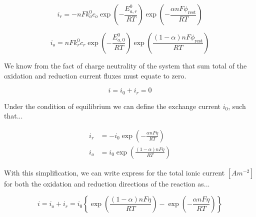 \documentclass[lettersize,journal]{IEEEtran}
\begin{document}
\begin{equation}
i_{r}=-n F k_{o}^{0} c_{o} \exp \left(-\frac{E_{a, r}^{0}}{R T}\right) \exp \left(-\frac{\alpha n F \phi_{\mathrm{rest}}}{R T}\right)
\end{equation}

\begin{equation}
i_{o}=n F k_{r}^{0} c_{r} \exp \left(-\frac{E_{a, 0}^{0}}{R T}\right) \exp \left(\frac{(1-\alpha) n F \phi_{\mathrm{rest}}}{R T}\right)
\end{equation}

\noindent We know from the fact of charge neutrality of the system that sum total of the oxidation and reduction current fluxes must equate to zero.

\begin{equation}
i=i_{0}+i_{r}=0
\end{equation}






\noindent Under the condition of equilibrium we can define the exchange current $i_0$, such that...


\begin{equation}
\begin{aligned}
i_{r} &=-i_{0} \exp \left(-\frac{\alpha n F \eta}{R T}\right) \\
i_{o} &=i_{0} \exp \left(\frac{(1-\alpha) n F \eta}{R T}\right)
\end{aligned}
\end{equation}

\noindent With this simplification, we can write express for the total ionic current $\left[ Am^{-2} \right]$ for both the oxidation and reduction directions of the reaction as...

\begin{equation}
i=i_{o}+i_{r}=i_{0}\left\{\exp \left(\frac{(1-\alpha) n F \eta}{R T}\right)-\exp \left(-\frac{\alpha n F \eta}{R T}\right)\right\}
\end{equation}
\end{document}
